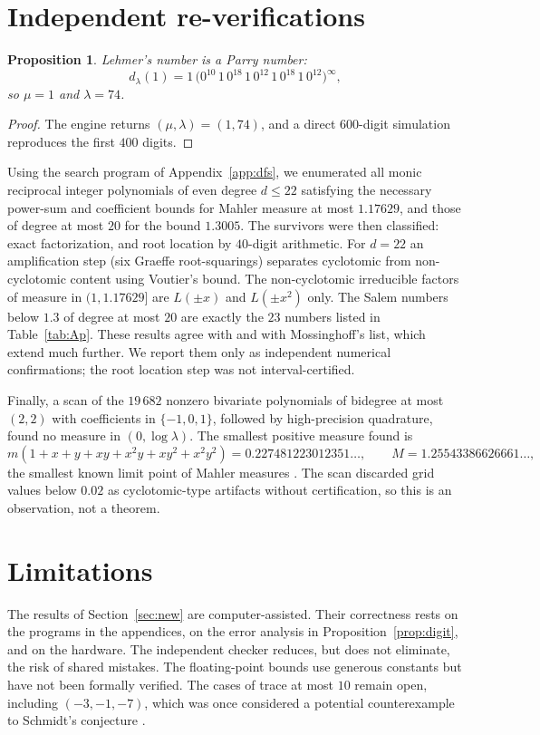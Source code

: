 \documentclass[11pt]{amsart}
\newtheorem{proposition}[theorem]{Proposition}
\theoremstyle{definition}
\theoremstyle{remark}
\begin{document}
\section{Independent re-verifications}\label{sec:reverify}

\begin{proposition}\label{prop:lehmerexp}
Lehmer's number is a Parry number:
\[
d_\lambda(1)=1\,\big(0^{10}\,1\,0^{18}\,1\,0^{12}\,1\,0^{18}\,1\,0^{12}\big)^\infty,
\]
so $\mu=1$ and $\lambda=74$.
\end{proposition}
\begin{proof}
The engine returns $(\mu,\lambda)=(1,74)$, and a direct $600$-digit simulation reproduces the first $400$ digits.
\end{proof}

Using the search program of Appendix~\ref{app:dfs}, we enumerated all monic reciprocal integer polynomials of even degree $d\le22$ satisfying the necessary power-sum and coefficient bounds for Mahler measure at most $1.17629$, and those of degree at most $20$ for the bound $1.3005$. The survivors were then classified: exact factorization, and root location by $40$-digit arithmetic. For $d=22$ an amplification step (six Graeffe root-squarings) separates cyclotomic from non-cyclotomic content using Voutier's bound. The non-cyclotomic irreducible factors of measure in $(1,1.17629]$ are $L(\pm x)$ and $L(\pm x^2)$ only. The Salem numbers below $1.3$ of degree at most $20$ are exactly the $23$ numbers listed in Table~\ref{tab:Ap}. These results agree with \cite{MRW} and with Mossinghoff's list, which extend much further. We report them only as independent numerical confirmations; the root location step was not interval-certified.

Finally, a scan of the $19\,682$ nonzero bivariate polynomials of bidegree at most $(2,2)$ with coefficients in $\{-1,0,1\}$, followed by high-precision quadrature, found no measure in $(0,\log\lambda)$. The smallest positive measure found is
\[
m(1+x+y+xy+x^2y+xy^2+x^2y^2)=0.227481223012351\ldots,\qquad M=1.25543386626661\ldots,
\]
the smallest known limit point of Mahler measures \cite{BHM,BoydMossinghoff}. The scan discarded grid values below $0.02$ as cyclotomic-type artifacts without certification, so this is an observation, not a theorem.

\section{Limitations}
The results of Section~\ref{sec:new} are computer-assisted. Their correctness rests on the programs in the appendices, on the error analysis in Proposition~\ref{prop:digit}, and on the hardware. The independent checker reduces, but does not eliminate, the risk of shared mistakes. The floating-point bounds use generous constants but have not been formally verified. The cases of trace at most $10$ remain open, including $(-3,-1,-7)$, which was once considered a potential counterexample to Schmidt's conjecture \cite{Stockton}.
\end{document}
